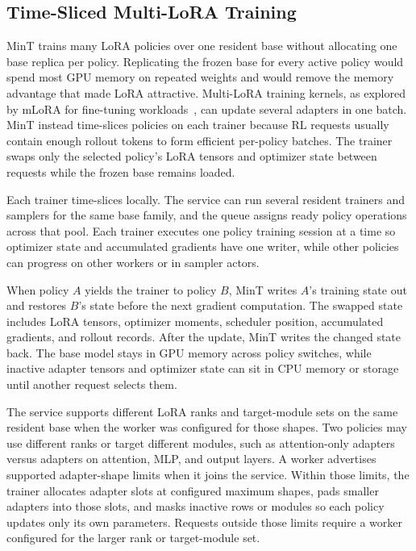 \documentclass{llmxive}
\begin{document}
\subsection{Time-Sliced Multi-LoRA Training}

MinT trains many LoRA policies over one resident base without allocating one base replica per policy. Replicating the frozen base for every active policy would spend most GPU memory on repeated weights and would remove the memory advantage that made LoRA attractive. Multi-LoRA training kernels, as explored by mLoRA for fine-tuning workloads~\citep{mlora2024}, can update several adapters in one batch. MinT instead time-slices policies on each trainer because RL requests usually contain enough rollout tokens to form efficient per-policy batches. The trainer swaps only the selected policy's LoRA tensors and optimizer state between requests while the frozen base remains loaded.

Each trainer time-slices locally. The service can run several resident trainers and samplers for the same base family, and the queue assigns ready policy operations across that pool. Each trainer executes one policy training session at a time so optimizer state and accumulated gradients have one writer, while other policies can progress on other workers or in sampler actors.

When policy $A$ yields the trainer to policy $B$, MinT writes $A$'s training state out and restores $B$'s state before the next gradient computation. The swapped state includes LoRA tensors, optimizer moments, scheduler position, accumulated gradients, and rollout records. After the update, MinT writes the changed state back. The base model stays in GPU memory across policy switches, while inactive adapter tensors and optimizer state can sit in CPU memory or storage until another request selects them.

The service supports different LoRA ranks and target-module sets on the same resident base when the worker was configured for those shapes. Two policies may use different ranks or target different modules, such as attention-only adapters versus adapters on attention, MLP, and output layers. A worker advertises supported adapter-shape limits when it joins the service. Within those limits, the trainer allocates adapter slots at configured maximum shapes, pads smaller adapters into those slots, and masks inactive rows or modules so each policy updates only its own parameters. Requests outside those limits require a worker configured for the larger rank or target-module set.
\end{document}
